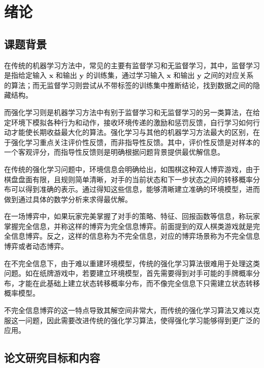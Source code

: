 
\chapter{绪论}
\label{chpt:introduction}

\section{课题背景}

在传统的机器学习方法中，常见的主要有监督学习和无监督学习\cite{goodfellow2016deep}，其中，监督学习是指给定输入 $\boldsymbol{x}$ 和输出 $\boldsymbol{y}$ 的训练集，通过学习输入 $\boldsymbol{x}$ 和输出 $\boldsymbol{y}$ 之间的对应关系的算法；而无监督学习则尝试从不带标签的训练集中推断结论，找到数据之间的隐藏结构\cite{goodfellow2016deep}。

而强化学习则是机器学习方法中有别于监督学习和无监督学习的另一类算法，在给定环境下模拟各种行为和动作，接收环境传递的激励和惩罚反馈，自行学习如何行动才能使长期收益最大化的算法。强化学习与其他的机器学习方法最大的区别，在于强化学习重点关注评价性反馈，而非指导性反馈。其中，评价性反馈是对样本的一个客观评分，而指导性反馈则是明确根据问题背景提供最优解信息\cite{sutton2018reinforcement}。

在传统的强化学习问题中，环境信息会明确给出，如围棋这种双人博弈游戏，由于棋盘盘面有限，且规则简单清晰，对手的当前状态和下一步状态之间的转移概率分布可以得到准确的表示\cite{silver2017mastering}。通过得知这些信息，能够清晰建立准确的环境模型，进而做到通过具体的数学分析来求得最优解。

在一场博弈中，如果玩家完美掌握了对手的策略、特征、回报函数等信息，称玩家掌握{\jiacu 完全信息}，并称这样的博弈为{\jiacu 完全信息博弈}。前面提到的双人棋类游戏就是完全信息博弈。反之，这样的信息称为{\jiacu 不完全信息}，对应的博弈场景称为{\jiacu 不完全信息博弈}或者{\jiacu 动态博弈}\cite{marinatto2000quantum}。

在不完全信息下，由于难以重建环境模型，传统的强化学习算法很难用于处理这类问题\cite{macdermed2011markov}。如在纸牌游戏中，若要建立环境模型，首先需要得到对手可能的手牌概率分布，才能在此基础上建立状态转移概率分布，而不像完全信息下只需建立状态转移概率模型。

不完全信息博弈的这一特点导致其解空间非常大\cite{sandholm2010state}，而传统的强化学习算法又难以克服这一问题，因此需要改进传统的强化学习算法，使得强化学习能够得到更广泛的应用。

\section{论文研究目标和内容}

